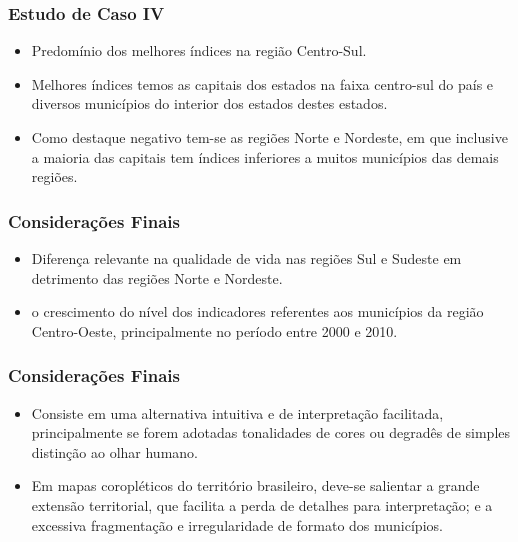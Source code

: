 \documentclass[aspectratio=169]{beamer}
\begin{document}
\begin{frame}
\frametitle{Estudo de Caso IV}
\justifying

\begin{itemize}
\item Predomínio dos melhores índices na região Centro-Sul. 

\item Melhores índices temos as capitais dos estados na faixa centro-sul do país e diversos municípios do interior dos estados destes estados.

\item Como destaque negativo tem-se as regiões Norte e Nordeste, em que inclusive a maioria das capitais tem índices inferiores a muitos municípios das demais regiões.

\end{itemize}





\end{frame}
\begin{frame}
\frametitle{Considerações Finais}
\justifying
\begin{itemize}

\item Diferença relevante na qualidade de vida nas regiões Sul e Sudeste em detrimento das regiões Norte e Nordeste.

\item o crescimento do nível dos indicadores referentes aos municípios da região Centro-Oeste,
principalmente no período entre 2000 e 2010.

\end{itemize}
\end{frame}

\begin{frame}
\frametitle{Considerações Finais}
\justifying

\begin{itemize}

\item Consiste em uma alternativa intuitiva e de interpretação facilitada, principalmente se forem adotadas tonalidades de cores ou degradês de simples distinção ao olhar humano.

\item Em mapas coropléticos do território brasileiro, deve-se salientar a grande extensão territorial, que
facilita a perda de detalhes para interpretação; e a excessiva fragmentação e irregularidade de formato dos municípios.

\end{itemize}



\end{frame}
\end{document}

